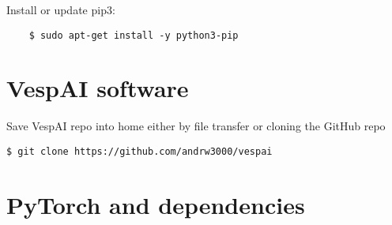 \documentclass[12pt, a4paper, oneside]{article}
\begin{document}
Install or update pip3:
\begin{verbatim}
	$ sudo apt-get install -y python3-pip 
\end{verbatim}

\section{VespAI software}
Save VespAI repo into home either by file transfer or cloning the GitHub repo
\begin{verbatim}
$ git clone https://github.com/andrw3000/vespai
\end{verbatim}


\section{PyTorch and dependencies}
\end{document}
